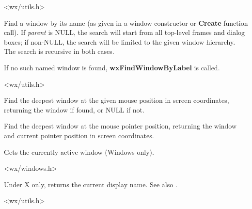 
<wx/utils.h>

\label{wxfindwindowbyname}


Find a window by its name (as given in a window constructor or {\bf Create} function call).
If {\it parent} is NULL, the search will start from all top-level
frames and dialog boxes; if non-NULL, the search will be limited to the given window hierarchy.
The search is recursive in both cases.

If no such named window is found, {\bf wxFindWindowByLabel} is called.


<wx/utils.h>

\label{wxfindwindowatpoint}


Find the deepest window at the given mouse position in screen coordinates,
returning the window if found, or NULL if not.

\label{wxfindwindowatpointer}


Find the deepest window at the mouse pointer position, returning the window
and current pointer position in screen coordinates.

\label{wxgetactivewindow}


Gets the currently active window (Windows only).


<wx/windows.h>

\label{wxgetdisplayname}


Under X only, returns the current display name. See also .


<wx/utils.h>

\label{wxgethomedir}

